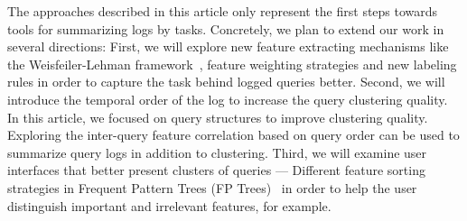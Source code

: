 The approaches described in this article only represent the first steps towards tools for summarizing logs by tasks.
Concretely, we plan to extend our work in several directions:
First, we will explore new feature extracting mechanisms like the Weisfeiler-Lehman framework~\cite{kul2016ettu}, feature weighting strategies and new labeling rules in order to capture the task behind logged queries better.
Second, we will introduce the temporal order of the log to increase the query clustering quality. In this article, we focused on query structures to improve clustering quality. Exploring the inter-query feature correlation based on query order can be used to summarize query logs in addition to clustering.
Third, we will examine user interfaces that better present clusters of queries --- Different feature sorting strategies in Frequent Pattern Trees (FP Trees)~\cite{han2004mining} in order to help the user distinguish important and irrelevant features, for example.
